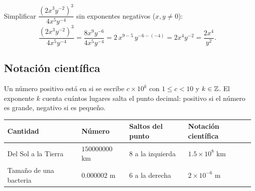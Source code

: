 \documentclass[11pt,a4paper]{article}
\let\nivelzuka\nivel
\renewcommand{\nivel}[2]{\Needspace{8\baselineskip}\nivelzuka{#1}{#2}}
\begin{document}
\begin{ejemplo}
Simplificar $\dfrac{\left(2x^{3}y^{-2}\right)^{3}}{4x^{5}y^{-4}}$ sin exponentes negativos ($x,y\neq0$):
\[ \frac{\left(2x^{3}y^{-2}\right)^{3}}{4x^{5}y^{-4}}=\frac{8x^{9}y^{-6}}{4x^{5}y^{-4}}=2\,x^{9-5}\,y^{-6-(-4)}=2x^{4}y^{-2}=\frac{2x^{4}}{y^{2}}. \]
\end{ejemplo}

\subsection{Notación científica}
\begin{definicion}
Un número positivo está en  si se escribe $c\times10^{k}$ con $1\le c<10$ y $k\in\mathbb{Z}$.
El exponente $k$ cuenta cuántos lugares salta el punto decimal: positivo si el número es grande, negativo si es pequeño.
\end{definicion}
\begin{center}
\begin{tabularx}{\linewidth}{@{}l l L l@{}}
\toprule
Cantidad & Número & Saltos del punto & Notación científica\\ \midrule
Del Sol a la Tierra & $\num{150000000}$ km & $8$ a la izquierda & $1.5\times10^{8}$ km\\
Tamaño de una bacteria & $0.000002$ m & $6$ a la derecha & $2\times10^{-6}$ m\\
\bottomrule
\end{tabularx}
\end{center}

\end{document}
